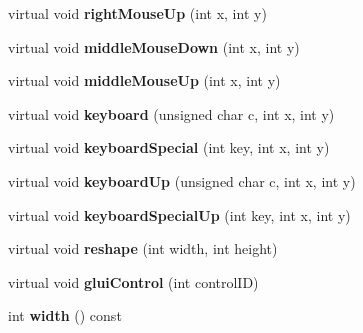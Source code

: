\begin{DoxyCompactItemize}
\item 
\hypertarget{classBaseGfxApp_a812643d563522a993457dd565c33f8f6}{virtual void {\bfseries right\-Mouse\-Up} (int x, int y)}\label{classBaseGfxApp_a812643d563522a993457dd565c33f8f6}

\item 
\hypertarget{classBaseGfxApp_a2c98cae9bb5ad1fb1832a6d4812670f8}{virtual void {\bfseries middle\-Mouse\-Down} (int x, int y)}\label{classBaseGfxApp_a2c98cae9bb5ad1fb1832a6d4812670f8}

\item 
\hypertarget{classBaseGfxApp_a00fc05e8d9629b72302b5adf014bdb0c}{virtual void {\bfseries middle\-Mouse\-Up} (int x, int y)}\label{classBaseGfxApp_a00fc05e8d9629b72302b5adf014bdb0c}

\item 
\hypertarget{classBaseGfxApp_a6d91e0cb7a3d48cad33956efe7eb36ca}{virtual void {\bfseries keyboard} (unsigned char c, int x, int y)}\label{classBaseGfxApp_a6d91e0cb7a3d48cad33956efe7eb36ca}

\item 
\hypertarget{classBaseGfxApp_a345566e62c9e4ec3705ec4d1c4c75f1f}{virtual void {\bfseries keyboard\-Special} (int key, int x, int y)}\label{classBaseGfxApp_a345566e62c9e4ec3705ec4d1c4c75f1f}

\item 
\hypertarget{classBaseGfxApp_acc4a40ce11edd6b6660a19cb4802a2bf}{virtual void {\bfseries keyboard\-Up} (unsigned char c, int x, int y)}\label{classBaseGfxApp_acc4a40ce11edd6b6660a19cb4802a2bf}

\item 
\hypertarget{classBaseGfxApp_afd14b435ff93b1e7f461cb8bd1a6fd59}{virtual void {\bfseries keyboard\-Special\-Up} (int key, int x, int y)}\label{classBaseGfxApp_afd14b435ff93b1e7f461cb8bd1a6fd59}

\item 
\hypertarget{classBaseGfxApp_a5d8d5d778a8aecd7f5f8e9c87f4c3d20}{virtual void {\bfseries reshape} (int width, int height)}\label{classBaseGfxApp_a5d8d5d778a8aecd7f5f8e9c87f4c3d20}

\item 
\hypertarget{classBaseGfxApp_a2978a7c358794c67df73b66776b2cef3}{virtual void {\bfseries glui\-Control} (int control\-I\-D)}\label{classBaseGfxApp_a2978a7c358794c67df73b66776b2cef3}

\item 
\hypertarget{classBaseGfxApp_ace089a1a94fb6bb0bc17e1b7fa48e05d}{int {\bfseries width} () const }\label{classBaseGfxApp_ace089a1a94fb6bb0bc17e1b7fa48e05d}


\end{DoxyCompactItemize}
